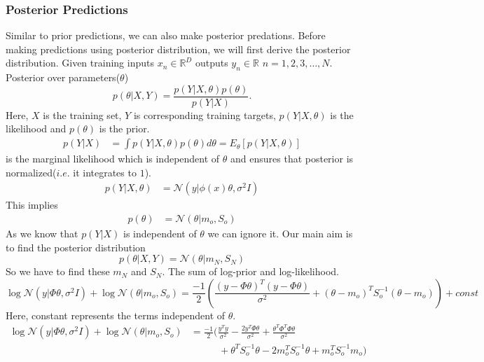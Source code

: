 \documentclass[12pt]{article}
\numberwithin{equation}{section}
\begin{document}
{\subsubsection{Posterior Predictions}
Similar to prior predictions, we can also make posterior predations. Before making predictions using posterior distribution, we will first derive the posterior distribution. Given training inputs $x_n \in \mathbb{R}^D$ outputs $y_n \in \mathbb{R}$ $n=1, 2, 3,\dots, N$. Posterior over parameters($\theta$)
\begin{equation*}
	p(\theta|X, Y) = \frac{p(Y|X, \theta)p(\theta)}{p(Y|X)}.
\end{equation*}
Here, $X$ is the training set, $Y$ is corresponding training targets, $p(Y|X, \theta)$ is the likelihood and $p(\theta)$ is the prior.
\begin{align} \label{marginal}
	p(Y|X) &= \int p(Y|X, \theta)p(\theta)d\theta= E_\theta[p(Y|X, \theta)] 
\end{align}
is the marginal likelihood which is independent of $\theta$ and ensures that posterior is normalized($i.e.$ it integrates to $1$).
\begin{align*}
	p(Y|X, \theta) &= \mathcal{N}(y|\phi(x)\theta, \sigma^2I)
	\end{align*}
	This implies
	\begin{align*}
	p(\theta) &= \mathcal{N}(\theta|m_o, S_o) 
\end{align*}
As we know that $p(Y|X)$ is independent of $\theta$ we can ignore it. Our main aim is to find the posterior distribution
\begin{equation*}
	p(\theta|X, Y) = \mathcal{N}(\theta|m_N, S_N)
\end{equation*}
So we have to find these $m_N$ and $S_N$. The sum of log-prior and log-likelihood.
\begin{equation*}
	\log \mathcal{N}(y|\Phi\theta, \sigma^2I) + \log \mathcal{N}(\theta| m_o, S_o) = \frac{-1}{2}(\frac{(y-\Phi\theta)^T(y-\Phi\theta)}{\sigma^2} + (\theta - m_o)^TS_o^{-1}(\theta - m_o)) +const
\end{equation*}
 Here, constant represents the terms independent of $\theta$.
 \begin{align*}
 	\log \mathcal{N}(y|\Phi\theta, \sigma^2I) + \log \mathcal{N}(\theta| m_o, S_o) &= \frac{-1}{2}\big(\frac{y^Ty}{\sigma^2} - \frac{2y^T\Phi\theta}{\sigma^2} + \frac{\theta^T\Phi^T\Phi\theta}{\sigma^2}\\
 	&~~~~~~~~~~~~~ + \theta^TS_o^{-1}\theta - 2m_o^TS_o^{-1}\theta + m_o^TS_o^{-1}m_o\big)\\

\end{align*}}
\end{document}
